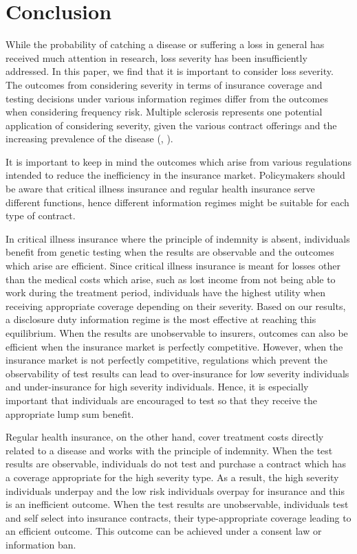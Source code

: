 \documentclass[natbib=false,preprint,12pt]{elsarticle}
\theoremstyle{plain}
\theoremstyle{definition}
\theoremstyle{plain}
\theoremstyle{TheoremNum}
\theoremstyle{CorollaryNum}
\theoremstyle{PropositionNum}
\theoremstyle{TheoremNum}
\begin{document}
\section{Conclusion}

While the probability of catching a disease or suffering a loss in general has received much attention in research, loss severity has been insufficiently addressed. In this paper, we find that it is important to consider loss severity. The outcomes from considering severity in terms of insurance coverage and testing decisions under various information regimes differ from the outcomes when considering frequency risk. Multiple sclerosis represents one potential application of considering severity, given the various contract offerings and the increasing prevalence of the disease (\citeauthor{flachenecker2017new}, \citeyear{flachenecker2017new}). 

It is important to keep in mind the outcomes which arise from various regulations intended to reduce the inefficiency in the insurance market. Policymakers should be aware that critical illness insurance and regular health insurance serve different functions, hence different information regimes might be suitable for each type of contract. 

In critical illness insurance where the principle of indemnity is absent, individuals benefit from genetic testing when the results are observable and the outcomes which arise are efficient. Since critical illness insurance is meant for losses other than the medical costs which arise, such as lost income from not being able to work during the treatment period, individuals have the highest utility when receiving appropriate coverage depending on their severity. Based on our results, a disclosure duty information regime is the most effective at reaching this equilibrium. When the results are unobservable to insurers, outcomes can also be efficient when the insurance market is perfectly competitive. However, when the insurance market is not perfectly competitive, regulations which prevent the observability of test results can lead to over-insurance for low severity individuals and under-insurance for high severity individuals. Hence, it is especially important that individuals are encouraged to test so that they receive the appropriate lump sum benefit. 

Regular health insurance, on the other hand, cover treatment costs directly related to a disease and works with the principle of indemnity. When the test results are observable, individuals do not test and purchase a contract which has a coverage appropriate for the high severity type. As a result, the high severity individuals underpay and the low risk individuals overpay for insurance and this is an inefficient outcome. When the test results are unobservable, individuals test and self select into insurance contracts, their type-appropriate coverage leading to an efficient outcome. This outcome can be achieved under a consent law or information ban. 
\end{document}
